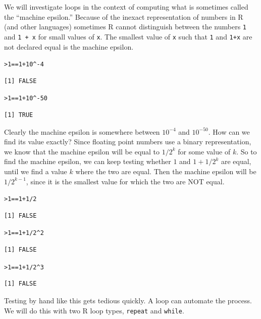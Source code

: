 \documentclass[12pt,oneside]{book}\usepackage[]{graphicx}\usepackage[]{color}
\makeatletter
\newcommand{\hlnum}[1]{\textcolor[rgb]{0.686,0.059,0.569}{#1}}%
\newcommand{\hlopt}[1]{\textcolor[rgb]{0,0,0}{#1}}%
\newcommand{\hlstd}[1]{\textcolor[rgb]{0.345,0.345,0.345}{#1}}%
\newenvironment{kframe}{%
 \def\at@end@of@kframe{}%
 \ifinner\ifhmode%
  \def\at@end@of@kframe{\end{minipage}}%
  \begin{minipage}{\columnwidth}%
 \fi\fi%
 \def\FrameCommand##1{\hskip\@totalleftmargin \hskip-\fboxsep
 \colorbox{shadecolor}{##1}\hskip-\fboxsep
     \hskip-\linewidth \hskip-\@totalleftmargin \hskip\columnwidth}%
 \MakeFramed {\advance\hsize-\width
   \@totalleftmargin\z@ \linewidth\hsize
   \@setminipage}}%
 {\par\unskip\endMakeFramed%
 \at@end@of@kframe}
\newenvironment{knitrout}{}{} %
\makeatother
\begin{document}
We will investigate loops in the context of computing what is sometimes called the ``machine epsilon.'' Because of the inexact representation of numbers in R (and other languages) sometimes R cannot distinguish between the numbers \verb+1+ and \verb|1 + x| for small values of \verb+x+. The smallest value of \verb+x+ such that \verb+1+ and \verb|1+x| are not declared equal is the machine epsilon. 
\begin{knitrout}
\color{fgcolor}\begin{kframe}
\begin{alltt}
\hlstd{> }\hlnum{1} \hlopt{==} \hlnum{1} \hlopt{+} \hlnum{10}\hlopt{^-}\hlnum{4}
\end{alltt}
\begin{verbatim}
[1] FALSE
\end{verbatim}
\begin{alltt}
\hlstd{> }\hlnum{1} \hlopt{==} \hlnum{1} \hlopt{+} \hlnum{10}\hlopt{^-}\hlnum{50}
\end{alltt}
\begin{verbatim}
[1] TRUE
\end{verbatim}
\end{kframe}
\end{knitrout}
Clearly the machine epsilon is somewhere between $10^{-4}$ and $10^{-50}$. How can we find its value exactly? Since floating point numbers use a binary representation, we know that the machine epsilon will be equal to $1/2^k$ for some value of $k$. So to find the machine epsilon, we can keep testing whether $1$ and $1+1/2^k$ are equal, until we find a value $k$ where the two are equal. Then the machine epsilon will be $1/2^{k-1}$, since it is the smallest value for which the two are NOT equal.
\begin{knitrout}
\color{fgcolor}\begin{kframe}
\begin{alltt}
\hlstd{> }\hlnum{1} \hlopt{==} \hlnum{1} \hlopt{+} \hlnum{1}\hlopt{/}\hlnum{2}
\end{alltt}
\begin{verbatim}
[1] FALSE
\end{verbatim}
\begin{alltt}
\hlstd{> }\hlnum{1} \hlopt{==} \hlnum{1} \hlopt{+} \hlnum{1}\hlopt{/}\hlnum{2}\hlopt{^}\hlnum{2}
\end{alltt}
\begin{verbatim}
[1] FALSE
\end{verbatim}
\begin{alltt}
\hlstd{> }\hlnum{1} \hlopt{==} \hlnum{1} \hlopt{+} \hlnum{1}\hlopt{/}\hlnum{2}\hlopt{^}\hlnum{3}
\end{alltt}
\begin{verbatim}
[1] FALSE
\end{verbatim}
\end{kframe}
\end{knitrout}
Testing by hand like this gets tedious quickly. A loop can automate the process. We will do this with two R loop types, \verb+repeat+ and \verb+while+.
\end{document}
